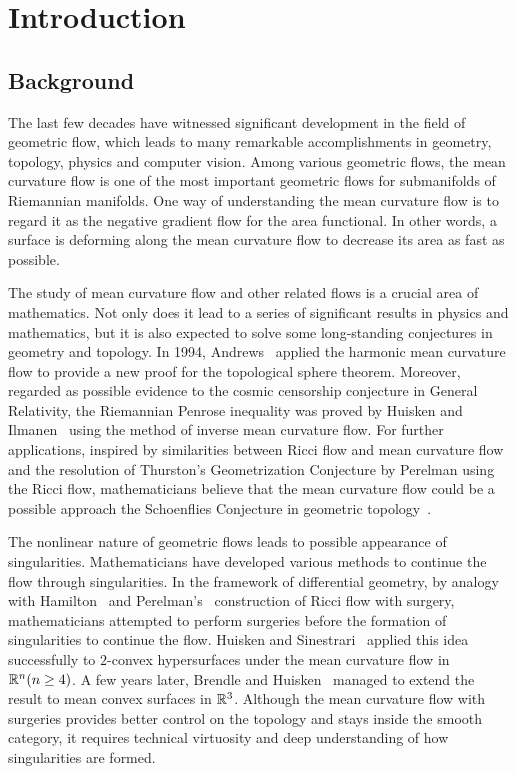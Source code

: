 %

\chapter{Introduction}

\section{Background}

The last few decades have witnessed significant development in the field of geometric flow, which leads to many remarkable accomplishments in geometry, topology, physics and computer vision. Among various geometric flows, the mean curvature flow is one of the most important geometric flows for submanifolds of Riemannian manifolds. One way of understanding the mean curvature flow is to regard it as the negative gradient flow for the area functional. In other words, a surface is deforming along the mean curvature flow to decrease its area as fast as possible.

The study of mean curvature flow and other related flows is a crucial area of mathematics. Not only does it lead to a series of significant results in physics and mathematics, but it is also expected to solve some long-standing conjectures in geometry and topology. In 1994, Andrews~\cite{andrews_contraction_1994} applied the harmonic mean curvature flow to provide a new proof for the topological sphere theorem. Moreover, regarded as possible evidence to the cosmic censorship conjecture in General Relativity, the Riemannian Penrose inequality was proved by Huisken and Ilmanen~\cite{huisken_inverse_2001} using the method of inverse mean curvature flow. For further applications, inspired by similarities between Ricci flow and mean curvature flow and the resolution of Thurston’s Geometrization Conjecture by Perelman using the Ricci flow, mathematicians believe that the mean curvature flow could be a possible approach the Schoenflies Conjecture in geometric topology~\cite{chodosh2020mean,bernstein2020closed}.

The nonlinear nature of geometric flows leads to possible appearance of singularities. Mathematicians have developed various methods to continue the flow through singularities. In the framework of differential geometry, by analogy with Hamilton~\cite{Hamilton1997FourmanifoldsWP} and Perelman's~\cite{perelman2002entropy,perelman2003ricci} construction of Ricci flow with surgery, mathematicians attempted to perform surgeries before the formation of singularities to continue the flow. Huisken and Sinestrari~\cite{Huisken2009MeanCF} applied this idea successfully to $2$-convex hypersurfaces under the mean curvature flow in $\mathbb{R}^n(n \geq 4)$. A few years later, Brendle and Huisken~\cite{brendle_mean_2016} managed to extend the result to mean convex surfaces in $\mathbb{R}^3$. Although the mean curvature flow with surgeries provides better control on the topology and stays inside the smooth category, it requires technical virtuosity and deep understanding of how singularities are formed.


